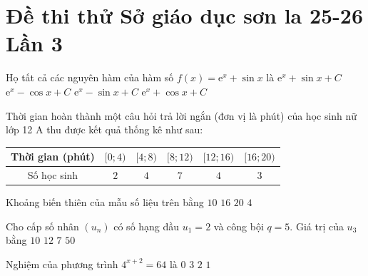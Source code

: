 \section*{Đề thi thử Sở giáo dục sơn la 25-26 Lần 3}
\begin{ex} %
	Họ tất cả các nguyên hàm của hàm số $f(x)=\mathrm{e}^x+\sin x$ là
	\choice
	{$\mathrm{e}^x+\sin x+C$}
	{\True $\mathrm{e}^x-\cos x+C$}
	{$\mathrm{e}^x-\sin x+C$}
	{$\mathrm{e}^x+\cos x+C$}
	\loigiai{
	}
\end{ex}
\begin{ex} %
	Thời gian hoàn thành một câu hỏi trả lời ngắn (đơn vị là phút) của học sinh nữ lớp 12 A thu được kết quả thống kê như sau:
	\begin{center}
		\begin{tabular}{|c|c|c|c|c|c|}
			\hline
			Thời gian (phút) & $[0;4)$ & $[4;8)$ & $[8;12)$ & $[12;16)$ & $[16;20)$ \\
			\hline
			Số học sinh & $2$ & $4$ & $7$ & $4$ & $3$ \\
			\hline
		\end{tabular}
	\end{center}
	Khoảng biến thiên của mẫu số liệu trên bằng
	\choice
	{$10$}
	{$16$}
	{\True $20$}
	{$4$}
	\loigiai{
	}
\end{ex}
\begin{ex} %
	Cho cấp số nhân $\left(u_n\right)$ có số hạng đầu $u_1=2$ và công bội $q=5$. Giá trị của $u_3$ bằng
	\choice
	{$10$}
	{$12$}
	{$7$}
	{\True $50$}
	\loigiai{
	}
\end{ex}
\begin{ex} %
	Nghiệm của phương trình $4^{x+2}=64$ là
	\choice
	{$0$}
	{$3$}
	{$2$}
	{\True $1$}
	\loigiai{
	}
\end{ex}
\begin{ex} %
	\loigiai{
	}
\end{ex}
